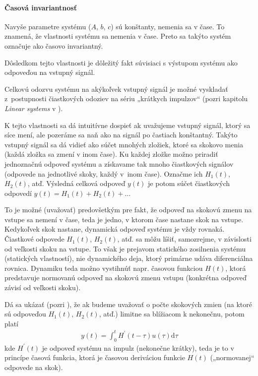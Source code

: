 \documentclass[a4paper, 10pt, ]{article}
\begin{document}
\paragraph{Časová invariantnosť}

Navyše parametre systému ($A$, $b$, $c$) sú konštanty, nemenia sa v čase. To znamená, že vlastnosti systému sa nemenia v čase. Preto sa takýto systém označuje ako časovo invariantný.

Dôsledkom tejto vlastnosti je dôležitý fakt súvisiaci s výstupom systému ako odpoveďou na vstupný signál.

Celkovú odozvu systému na akýkoľvek vstupný signál je možné vyskladať z~postupnosti čiastkových odoziev na sériu „krátkych impulzov“ (pozri kapitolu \emph{Linear systems} v \cite{AsM08se}).

K tejto vlastnosti sa dá intuitívne dospieť ak uvažujeme vstupný signál, ktorý sa síce mení, ale pozeráme sa naň ako na signál po častiach konštantný. Takýto vstupný signál sa dá vidieť ako súčet mnohých zložiek, ktoré sa skokovo menia (každá zložka sa zmení v inom čase). Ku každej zložke možno priradiť jednoznačnú odpoveď systému a získavame tak mnoho čiastkových signálov (odpovede na jednotlivé skoky, každý v~inom čase). Označme ich $H_1(t)$, $H_2(t)$, atď. Výsledná celková odpoveď $y(t)$ je potom súčet čiastkových odpovedí $y(t) = H_1(t) + H_2(t) + \ldots$

To je možné (uvažovať) predovšetkým pre fakt, že odpoveď na skokovú zmenu na vstupe sa nemení v čase, teda je jedno, v ktorom čase nastane skok na vstupe. Kedykoľvek skok nastane, dynamická odpoveď systému je vždy rovnaká. Čiastkové odpovede $H_1(t)$, $H_2(t)$, atď. sa môžu líšiť, samozrejme, v závislosti od veľkosti skoku na vstupe. To však je prejavom statického zosilnenia systému (statických vlastností), nie dynamického deja, ktorý primárne udáva diferenciálna rovnica. Dynamiku teda možno vystihnúť napr. časovou funkciou $H(t)$, ktorá predstavuje normovanú odpoveď na skokovú zmenu vstupu (konkrétna odpoveď závisí od veľkosti skoku).

Dá sa ukázať (pozri \cite{AsM08se}), že ak budeme uvažovať o počte skokových zmien (na ktoré sú odpoveďou $H_1(t)$, $H_2(t)$, atď.) limitne sa blížiacom k nekonečnu, potom platí
\begin{align}
	y(t) = \int_0^t H^\prime(t - \tau)u(\tau) \text{d}\tau
\end{align}
kde $H^\prime(t)$ je odpoveď systému na impulz (nekonečne krátky), teda je to v princípe časová funkcia, ktorá je časovou deriváciou funkcie $H(t)$ („normovanej“ odpovede na skok).
\end{document}
